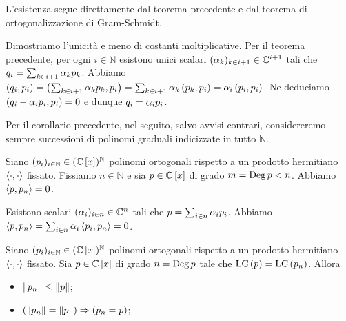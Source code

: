 \Proof L'esistenza segue direttamente dal teorema precedente e dal teorema di ortogonalizzazione di Gram-Schmidt.
\par Dimostriamo l'unicit\`a e meno di costanti moltiplicative. Per il teorema precedente, per ogni $i \in \mathbb{N}$ esistono unici scalari $(\alpha_k)_{k \in i + 1} \in \mathbb{C}^{i + 1}$ tali che $q_i = \sum_{k \in i + 1} \alpha_k p_k$. Abbiamo
$\left ( q_i , p_i \right ) =
\left ( \sum_{k \in i + 1} \alpha_k p_k , p_i \right ) =
\sum _{k \in i + 1} \alpha_k \left ( p_k , p_i \right ) =
\alpha_i \left ( p_i , p_i \right )$. Ne deduciamo $\left ( q_i - \alpha_ip_i , p_i \right ) = 0$ e dunque $q_i = \alpha_i p_i$. \EndProof
\par Per il corollario precedente, nel seguito, salvo avvisi contrari, considereremo sempre successioni di polinomi graduali indicizzate in tutto $\mathbb{N}$.
\begin{Theorem}
	Siano $(p_i)_{i \in \mathbb{N}} \in (\mathbb{C} \left [ x \right ])^\mathbb{N}$ polinomi ortogonali rispetto a un prodotto hermitiano $\left \langle \cdot , \cdot \right \rangle$ fissato. Fissiamo $n \in \mathbb{N}$ e sia $p \in \mathbb{C} \left [ x \right ]$ di grado $m = \operatorname{\operatorname{Deg}}{p} < n$. Abbiamo $\left \langle p , p_n \right \rangle = 0$.
\end{Theorem}
\Proof Esistono scalari $(\alpha_i)_{i \in n} \in \mathbb{C}^n$ tali che $p = \sum_{i \in n} \alpha_i p_i$. Abbiamo $\left \langle p , p_n \right \rangle = \sum_{i \in n} \alpha_i\left \langle p_i , p_n \right \rangle = 0$. \EndProof
\begin{Theorem}
	 Siano $(p_i)_{i \in \mathbb{N}} \in (\mathbb{C} \left [ x \right ])^\mathbb{N}$ polinomi ortogonali rispetto a un prodotto hermitiano $\left \langle \cdot , \cdot \right \rangle$ fissato. Sia $p \in \mathbb{C} \left [ x \right ]$ di grado $n = \operatorname{\operatorname{Deg}}{p}$ tale che $\text{LC} \left ( p \right ) = \text{LC} \left ( p_n \right )$. Allora
	\begin{itemize}
		\item $\Norm{\OrthogonalPolynomial_n} \leq \Norm{\Polynomial}$;
		\item $\Implies{\Norm{\OrthogonalPolynomial_n} = \Norm{\Polynomial}}{\OrthogonalPolynomial_n = \Polynomial}$;
	\end{itemize}
\end{Theorem}
